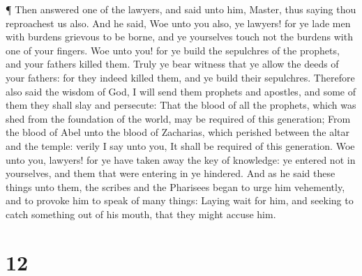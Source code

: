  ¶ Then answered one of the lawyers, and said unto him,
Master, thus saying thou reproachest us also.  And he said,
Woe unto you also, ye lawyers! for ye lade men with burdens grievous to
be borne, and ye yourselves touch not the burdens with one of your
fingers.  Woe unto you! for ye build the sepulchres of the
prophets, and your fathers killed them.  Truly ye bear
witness that ye allow the deeds of your fathers: for they indeed killed
them, and ye build their sepulchres.  Therefore also said
the wisdom of God, I will send them prophets and apostles, and some of
them they shall slay and persecute:  That the blood of all
the prophets, which was shed from the foundation of the world, may be
required of this generation;  From the blood of Abel unto
the blood of Zacharias, which perished between the altar and the temple:
verily I say unto you, It shall be required of this generation.
 Woe unto you, lawyers! for ye have taken away the key of
knowledge: ye entered not in yourselves, and them that were entering in
ye hindered.  And as he said these things unto them, the
scribes and the Pharisees began to urge him vehemently, and to provoke
him to speak of many things:  Laying wait for him, and
seeking to catch something out of his mouth, that they might accuse him.

\hypertarget{section-11}{%
\section{12}\label{section-11}}


